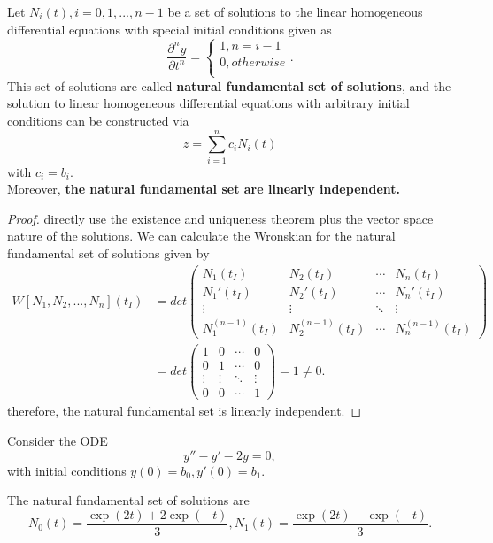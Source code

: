 \begin{refsection}
\begin{theorem}
Let $N_i(t),i=0,1,...,n-1$ be a set of solutions to the linear homogeneous differential equations with special initial conditions given as
$$\frac{\partial^n y}{\partial t^n} = \begin{cases} 
1, n=i-1\\
0, otherwise\\
\end{cases}.$$
This set of solutions are called \textbf{natural fundamental set of solutions}, and the solution to linear homogeneous differential equations with arbitrary initial conditions can be constructed via
$$z = \sum_{i=1}^{n} c_iN_i(t)$$
with $c_i=b_i$. \\
Moreover, \textbf{the natural fundamental set are linearly independent.} 
\end{theorem}
\begin{proof}
directly use the existence and uniqueness theorem plus the vector space nature of the solutions. 
We can calculate the Wronskian for the natural fundamental set of solutions given by	
\begin{align*}
W[N_1,N_2,...,N_n](t_I) &= det \begin{pmatrix}
N_1(t_I) & N_2(t_I) & \cdots & N_n(t_I)\\ 
N_1'(t_I) & N_2'(t_I) & \cdots & N_n'(t_I)\\ 
\vdots & \vdots & \ddots & \vdots\\ 
N_1^{(n-1)}(t_I) & N_2^{(n-1)}(t_I) & \cdots & N_n^{(n-1)}(t_I)
\end{pmatrix} \\
&=det \begin{pmatrix}
1 & 0 & \cdots & 0\\ 
0 & 1 & \cdots & 0\\ 
\vdots & \vdots & \ddots & \vdots\\ 
0 & 0 & \cdots & 1
\end{pmatrix} = 1 \neq 0.
\end{align*}	
therefore, the natural fundamental set is linearly independent.
\end{proof}

\begin{example}
Consider the ODE
$$y'' - y' - 2y =0,$$
with initial conditions $y(0) = b_0, y'(0) = b_1.$

The natural fundamental set of solutions are
$$N_0(t) = \frac{\exp(2t)+2\exp(-t)}{3},N_1(t) = \frac{\exp(2t)-\exp(-t)}{3}.$$


\end{example}
\end{refsection}
